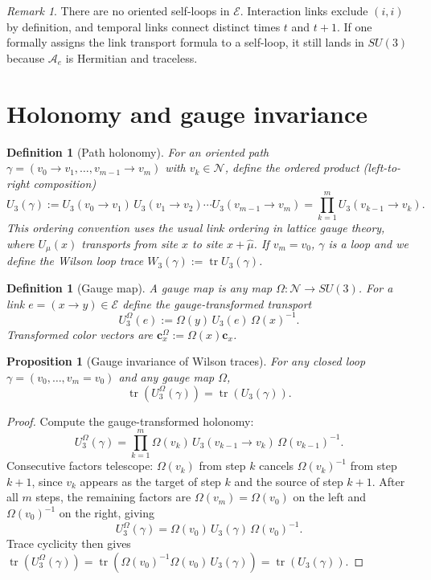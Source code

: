 \documentclass[11pt]{article}
\newtheorem{definition}[theorem]{Definition}
\newtheorem{proposition}[theorem]{Proposition}
\theoremstyle{remark}
\newtheorem{remark}[theorem]{Remark}
\newcommand{\mcN}{\mathcal N}
\newcommand{\mcE}{\mathcal E}
\newcommand{\tr}{\operatorname{tr}}
\begin{document}
\begin{remark}
There are no oriented self-loops in $\mcE$.
Interaction links exclude $(i,i)$ by definition, and temporal links connect
distinct times $t$ and $t+1$.
If one formally assigns the link transport formula to a self-loop, it still lands in
$SU(3)$ because $\mathcal A_e$ is Hermitian and traceless.
\end{remark}

\section{Holonomy and gauge invariance}
\label{sec:holonomy}

\begin{definition}[Path holonomy]
\label{def:path}
For an oriented path
$\gamma=(v_0\to v_1,\dots,v_{m-1}\to v_m)$ with $v_k\in\mcN$,
define the ordered product (left-to-right composition)
\[
U_3(\gamma):=U_3(v_0\to v_1)\,U_3(v_1\to v_2)\cdots U_3(v_{m-1}\to v_m)
=\prod_{k=1}^m U_3(v_{k-1}\to v_k).
\]
This ordering convention uses the usual link ordering in lattice gauge theory,
where $U_\mu(x)$ transports from site $x$ to site $x+\hat\mu$.
If $v_m=v_0$, $\gamma$ is a loop and we define the Wilson loop trace
$W_3(\gamma):=\tr U_3(\gamma)$.
\end{definition}

\begin{definition}[Gauge map]
\label{def:gauge}
A gauge map is any map $\Omega:\mcN\to SU(3)$.
For a link $e=(x\to y)\in\mcE$ define the gauge-transformed transport
\[
U_3^\Omega(e):=\Omega(y)\,U_3(e)\,\Omega(x)^{-1}.
\]
Transformed color vectors are $\mathbf c_x^\Omega:=\Omega(x)\mathbf c_x$.
\end{definition}

\begin{proposition}[Gauge invariance of Wilson traces]
\label{prop:gauge-invariance}
For any closed loop $\gamma=(v_0,\dots,v_m=v_0)$ and any gauge map $\Omega$,
\[
\tr\left(U_3^\Omega(\gamma)\right)=\tr\left(U_3(\gamma)\right).
\]
\end{proposition}
\begin{proof}
Compute the gauge-transformed holonomy:
\[
U_3^\Omega(\gamma)
=\prod_{k=1}^m \Omega(v_k)\,U_3(v_{k-1}\to v_k)\,\Omega(v_{k-1})^{-1}.
\]
Consecutive factors telescope: $\Omega(v_k)$ from step $k$ cancels
$\Omega(v_k)^{-1}$ from step $k+1$, since $v_k$ appears as the target of step $k$
and the source of step $k+1$.
After all $m$ steps, the remaining factors are $\Omega(v_m)=\Omega(v_0)$ on the left
and $\Omega(v_0)^{-1}$ on the right, giving
\[
U_3^\Omega(\gamma)=\Omega(v_0)\,U_3(\gamma)\,\Omega(v_0)^{-1}.
\]
Trace cyclicity then gives
$\tr(U_3^\Omega(\gamma))=\tr(\Omega(v_0)^{-1}\Omega(v_0)\,U_3(\gamma))=\tr(U_3(\gamma))$.
\end{proof}
\end{document}
